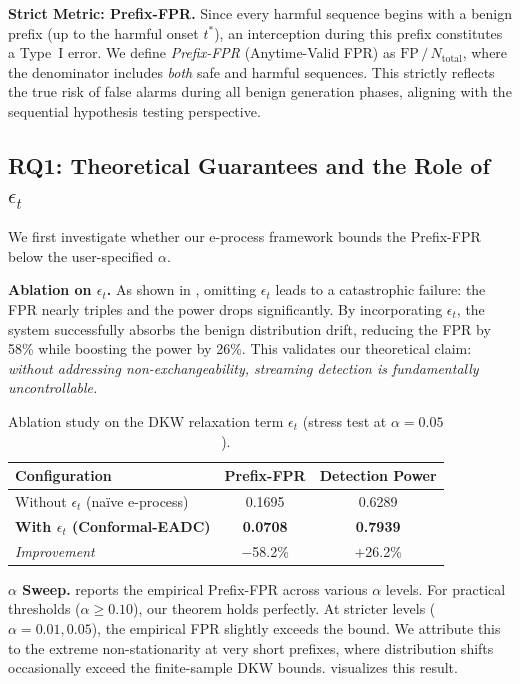 \documentclass[letterpaper,twocolumn,10pt]{article}
\begin{document}
\textbf{Strict Metric: Prefix-FPR.}
Since every harmful sequence begins with a benign prefix (up to the harmful onset $t^*$), an interception during this prefix constitutes a Type~I error.
We define \emph{Prefix-FPR} (Anytime-Valid FPR) as $\mathrm{FP}\,/\,N_{\mathrm{total}}$, where the denominator includes \emph{both} safe and harmful sequences.
This strictly reflects the true risk of false alarms during all benign generation phases, aligning with the sequential hypothesis testing perspective.

\subsection{RQ1: Theoretical Guarantees and the Role of $\epsilon_t$}
\label{sec:rq1}

We first investigate whether our e-process framework bounds the Prefix-FPR below the user-specified $\alpha$.

\textbf{Ablation on $\epsilon_t$.}
As shown in , omitting $\epsilon_t$ leads to a catastrophic failure: the FPR nearly triples and the power drops significantly.
By incorporating $\epsilon_t$, the system successfully absorbs the benign distribution drift, reducing the FPR by 58\% while boosting the power by 26\%.
This validates our theoretical claim: \emph{without addressing non-exchangeability, streaming detection is fundamentally uncontrollable.}

\begin{table}[t]
\centering
\caption{Ablation study on the DKW relaxation term $\epsilon_t$ (stress test at $\alpha=0.05$).}
\label{tab:ablation}
\small
\begin{tabular}{lcc}
\toprule
Configuration & Prefix-FPR & Detection Power \\
\midrule
Without $\epsilon_t$ (na\"ive e-process) & 0.1695 & 0.6289 \\
\textbf{With $\epsilon_t$ (Conformal-EADC)} & \textbf{0.0708} & \textbf{0.7939} \\
\midrule
\emph{Improvement} & $-$58.2\% & $+$26.2\% \\
\bottomrule
\end{tabular}
\end{table}

\textbf{$\alpha$ Sweep.}
 reports the empirical Prefix-FPR across various $\alpha$ levels.
For practical thresholds ($\alpha \ge 0.10$), our theorem holds perfectly.
At stricter levels ($\alpha = 0.01, 0.05$), the empirical FPR slightly exceeds the bound.
We attribute this to the extreme non-stationarity at very short prefixes, where distribution shifts occasionally exceed the finite-sample DKW bounds.
 visualizes this result.
\end{document}
